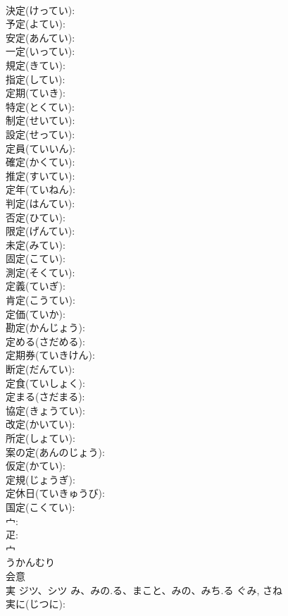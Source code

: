 \documentclass[8pt]{extreport}
\begin{document}
\begin{CJK}{UTF8}{min}
\\	決定(けってい): 
\\	予定(よてい): 
\\	安定(あんてい): 
\\	一定(いってい): 
\\	規定(きてい): 
\\	指定(してい): 
\\	定期(ていき): 
\\	特定(とくてい): 
\\	制定(せいてい): 
\\	設定(せってい): 
\\	定員(ていいん): 
\\	確定(かくてい): 
\\	推定(すいてい): 
\\	定年(ていねん): 
\\	判定(はんてい): 
\\	否定(ひてい): 
\\	限定(げんてい): 
\\	未定(みてい): 
\\	固定(こてい): 
\\	測定(そくてい): 
\\	定義(ていぎ): 
\\	肯定(こうてい): 
\\	定価(ていか): 
\\	勘定(かんじょう): 
\\	定める(さだめる): 
\\	定期券(ていきけん): 
\\	断定(だんてい): 
\\	定食(ていしょく): 
\\	定まる(さだまる): 
\\	協定(きょうてい): 
\\	改定(かいてい): 
\\	所定(しょてい): 
\\	案の定(あんのじょう): 
\\	仮定(かてい): 
\\	定規(じょうぎ): 
\\	定休日(ていきゅうび): 
\\	国定(こくてい): 
\\	宀: 
\\	疋: 
\\	宀	
\\	うかんむり	
\\	会意 
\\	実	ジツ、シツ	み、みの.る、まこと、みの、みち.る	ぐみ, さね	
\\	実に(じつに): 

\end{CJK}
\end{document}

